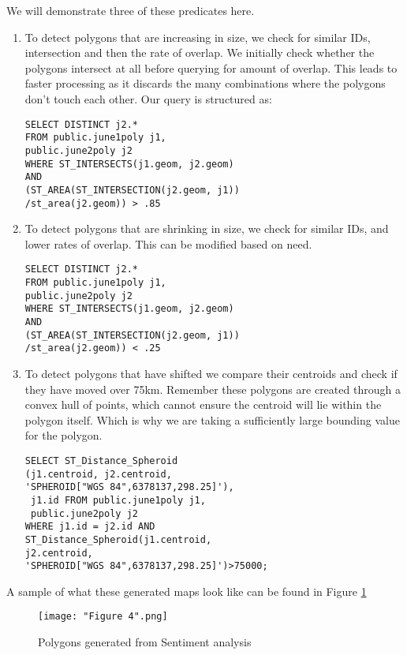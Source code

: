 \documentclass[conference]{IEEEtran}
\begin{document}
We will demonstrate three of these predicates here.

\begin{enumerate}
	\item To detect polygons that are increasing in size, we check for similar IDs, intersection and then the rate of overlap. We initially check whether the polygons intersect at all before querying for amount of overlap. This leads to faster processing as it discards the many combinations where the polygons don't touch each other. Our query is structured as:
\begin{lstlisting}
SELECT DISTINCT j2.* 
FROM public.june1poly j1,
public.june2poly j2 
WHERE ST_INTERSECTS(j1.geom, j2.geom)
AND  
(ST_AREA(ST_INTERSECTION(j2.geom, j1))
/st_area(j2.geom)) > .85
\end{lstlisting}

	\item To detect polygons that are shrinking  in size, we check for similar IDs, and lower rates of overlap. This can be modified based on need.
\begin{lstlisting}
SELECT DISTINCT j2.* 
FROM public.june1poly j1,
public.june2poly j2 
WHERE ST_INTERSECTS(j1.geom, j2.geom)
AND  
(ST_AREA(ST_INTERSECTION(j2.geom, j1))
/st_area(j2.geom)) < .25
\end{lstlisting}	

	\item To detect polygons that have shifted we compare their centroids and check if they have moved over 75km. Remember these polygons are created through a convex hull of points, which cannot ensure the centroid will lie within the polygon itself. Which is why we are taking a sufficiently large bounding value for the polygon.
\begin{lstlisting}
SELECT ST_Distance_Spheroid
(j1.centroid, j2.centroid, 
'SPHEROID["WGS 84",6378137,298.25]'), 
 j1.id FROM public.june1poly j1, 
 public.june2poly j2 
WHERE j1.id = j2.id AND 
ST_Distance_Spheroid(j1.centroid, 
j2.centroid, 
'SPHEROID["WGS 84",6378137,298.25]')>75000;
\end{lstlisting}	

\end{enumerate}

A sample of what these generated maps look like can be found in Figure \ref{Figure 5}

\begin{figure}[ht]
\centerline{\texttt{[image: "Figure 4".png]}}
\caption{Polygons generated from Sentiment analysis}
\label{Figure 5}
\end{figure}
\end{document}
